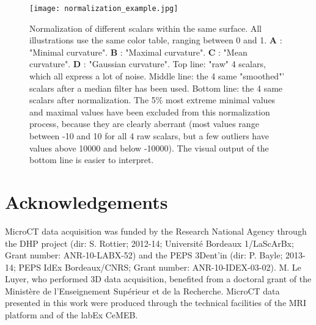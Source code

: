\documentclass[12pt, a4paper]{book}
\begin{document}
\begin{figure}
  \centering
  \texttt{[image: normalization\_example.jpg]} 
	\caption{ 
Normalization of different scalars within the same surface. All illustrations use the same color table, ranging between 0 and 1.  \textbf{A} : "Minimal curvature".  \textbf{B} : "Maximal curvature". \textbf{C} : "Mean curvature". \textbf{D} : "Gaussian curvature". Top line: "raw" 4 scalars, which all express a lot of noise. Middle line: the 4 same "smoothed"' scalars after a median filter has been used. Bottom line: the 4 same scalars after normalization. The 5\% most extreme minimal values and maximal values have been excluded from this normalization process, because they are clearly aberrant (most values range between -10 and 10 for all 4 raw scalars, but a few outliers have values above 10000 and below -10000). The visual output of the bottom line is easier to interpret.	
	}
\label{normalization_example}
\end{figure}

\section{Acknowledgements}
MicroCT data acquisition was funded by the Research National Agency through the DHP project (dir: S. Rottier; 2012-14; Université Bordeaux 1/LaScArBx; Grant number: ANR-10-LABX-52) and the PEPS 3Dent’in (dir: P. Bayle; 2013-14; PEPS IdEx Bordeaux/CNRS; Grant number: ANR-10-IDEX-03-02). M. Le Luyer, who performed 3D data acquisition, benefited from a doctoral grant of the Ministère de l’Enseignement Supérieur et de la Recherche. MicroCT data presented in this work were produced through the technical facilities of the MRI platform and of the labEx CeMEB.




	
\end{document}
